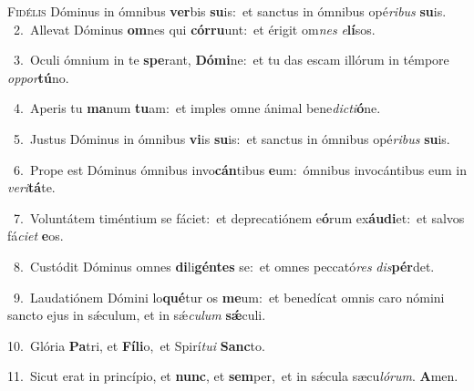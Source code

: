 \lettrine{\initial\textcolor{\initialcolor}{F}}{idélis} Dóminus in ómnibus \textbf{ver}\-bis \textbf{su}\-is:~\star et sanctus in ómnibus opé\-\textit{ri}\-\textit{bus} \textbf{su}\-is.\\
{\numbfont\textcolor{\numbcolor}{~2.}}~Allevat Dóminus \textbf{om}\-nes qui \textbf{cór}\-\textbf{ru}unt:~\star et érigit om\textit{nes} \textit{e}\-\textbf{lí}sos.\par
{\numbfont\textcolor{\numbcolor}{~3.}}~Oculi ómnium in te \textbf{spe}\-rant, \textbf{Dó}\-\textbf{mi}ne:~\star et tu das escam illórum in témpore \textit{op}\-\textit{por}\textbf{tú}no.\par
{\numbfont\textcolor{\numbcolor}{~4.}}~Aperis tu \textbf{ma}\-num \textbf{tu}\-am:~\star et imples omne ánimal bene\-\textit{dic}\-\textit{ti}\textbf{ó}ne.\par
{\numbfont\textcolor{\numbcolor}{~5.}}~Justus Dóminus in ómnibus \textbf{vi}\-is \textbf{su}\-is:~\star et sanctus in ómnibus opé\-\textit{ri}\-\textit{bus} \textbf{su}\-is.\par
{\numbfont\textcolor{\numbcolor}{~6.}}~Prope est Dóminus ómnibus invo\-\textbf{cán}\-tibus \textbf{e}\-um:~\star ómnibus invocántibus eum in \textit{ve}\-\textit{ri}\textbf{tá}te.\par
{\numbfont\textcolor{\numbcolor}{~7.}}~Voluntátem timéntium se fáciet:~\dagger et deprecatiónem e\-\textbf{ó}\-rum ex\-\textbf{áu}\-\textbf{di}et:~\star et salvos fá\-\textit{ci}\-\textit{et} \textbf{e}\-os.\par
{\numbfont\textcolor{\numbcolor}{~8.}}~Custódit Dóminus omnes \textbf{di}\-li\-\textbf{gén}\-\textbf{tes} se:~\star et omnes peccató\textit{res} \textit{dis}\-\textbf{pér}det.\par
{\numbfont\textcolor{\numbcolor}{~9.}}~Laudatiónem Dómini lo\-\textbf{qué}\-tur os \textbf{me}\-um:~\star et benedícat omnis caro nómini sancto ejus in sǽculum, et in sǽ\-\textit{cu}\-\textit{lum} \textbf{sǽ}\-culi.\par
{\numbfont\textcolor{\numbcolor}{10.}}~Glória \textbf{Pa}\-tri, et \textbf{Fí}\-\textbf{li}o,~\star et Spirí\-\textit{tu}\-\textit{i} \textbf{Sanc}\-to.\par
{\numbfont\textcolor{\numbcolor}{11.}}~Sicut erat in princípio, et \textbf{nunc}\-, et \textbf{sem}\-per,~\star et in sǽcula sæcu\-\textit{ló}\-\textit{rum}. \textbf{A}\-men.\par
